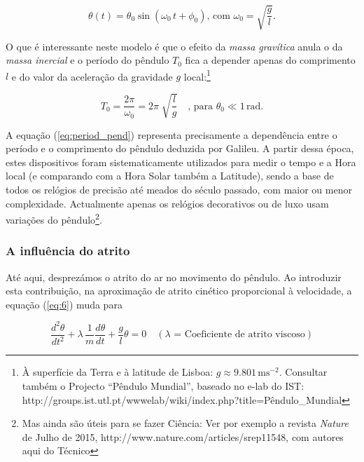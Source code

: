 \documentclass[a4paper,twoside,12pt]{article}      %
\begin{document}
\begin{equation}
	\label{eq:solu_pend}
\theta (t) = \theta_0 \sin(\omega_0 \, t + \phi_0) \text{, com } \omega_0 = \sqrt{\frac{g}{l}}.
\end{equation}

O que é interessante neste modelo é que o efeito da \emph{massa gravítica } anula o da \emph{massa inercial } e o período do pêndulo $T_0$ fica a  depender apenas do comprimento $l$  e do valor da aceleração da gravidade $g$  local:\footnote{À superfície da Terra e à latitude de Lisboa: $g\approx 9.801\,\mathrm{m s^{-2}}$. Consultar também o Projecto ``Pêndulo Mundial'', baseado no e-lab do IST: http://groups.ist.utl.pt/wwwelab/wiki/index.php?title=Pêndulo\_Mundial}


\begin{equation}
	\label{eq:period_pend}
T_0 = \frac{2 \pi}{\omega_0} = 2\pi\; \sqrt{\frac{l}{g}} \quad  \text{, para }	\theta_0 \ll 1 \, \mathrm{rad}.
\end{equation}

A equação (\ref{eq:period_pend}) representa precisamente a dependência entre o período e o comprimento do pêndulo deduzida por Galileu.
A partir dessa época, estes dispositivos foram sistematicamente utilizados para medir o tempo e a Hora local (e comparando com a Hora Solar também a Latitude), sendo a base 
de  todos os relógios de precisão até meados do século passado, com maior ou menor complexidade.
Actualmente apenas os relógios decorativos ou de luxo usam variações do pêndulo\footnote{Mas ainda são úteis para se fazer Ciência: Ver por exemplo a revista \emph{Nature} de Julho de 2015, http://www.nature.com/articles/srep11548, com autores aqui do Técnico}.

\subsubsection{A influência do atrito}
Até aqui, desprezámos o atrito do ar no movimento do pêndulo. Ao introduzir esta contribuição, na aproximação de atrito cinético 
proporcional à velocidade, a  equação (\ref{eq:6}) muda para

\begin{equation}
	 \frac{d^2 \theta}{dt^2} + \lambda \, \frac{1}{m}  \frac{d \theta}{dt} + \frac{g}{l} \theta =0 \quad (\lambda \text{ = Coeficiente de atrito viscoso})
\end{equation}
\end{document}
